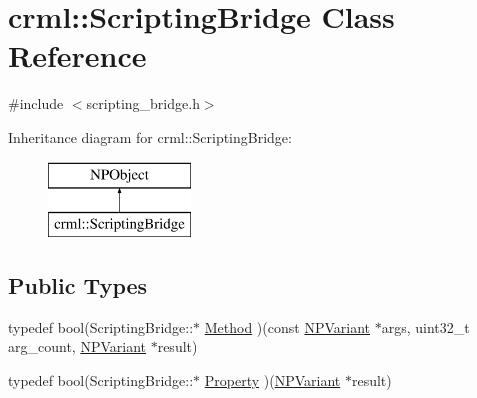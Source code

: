 \hypertarget{classcrml_1_1_scripting_bridge}{
\section{crml::ScriptingBridge Class Reference}
\label{classcrml_1_1_scripting_bridge}
}


{\ttfamily \#include $<$scripting\_\-bridge.h$>$}

Inheritance diagram for crml::ScriptingBridge:\begin{figure}[H]
\begin{center}
\leavevmode
\includegraphics[height=2cm]{classcrml_1_1_scripting_bridge}
\end{center}
\end{figure}
\subsection*{Public Types}
\begin{DoxyCompactItemize}
\item 
typedef bool(ScriptingBridge::$\ast$ \hyperlink{classcrml_1_1_scripting_bridge_a914d759a85c8280e66b435b824c6f06e}{Method} )(const \hyperlink{struct___n_p_variant}{NPVariant} $\ast$args, uint32\_\-t arg\_\-count, \hyperlink{struct___n_p_variant}{NPVariant} $\ast$result)
\item 
typedef bool(ScriptingBridge::$\ast$ \hyperlink{classcrml_1_1_scripting_bridge_a784ee1ef915801e5c5facde3d6c70aef}{Property} )(\hyperlink{struct___n_p_variant}{NPVariant} $\ast$result)
\end{DoxyCompactItemize}
